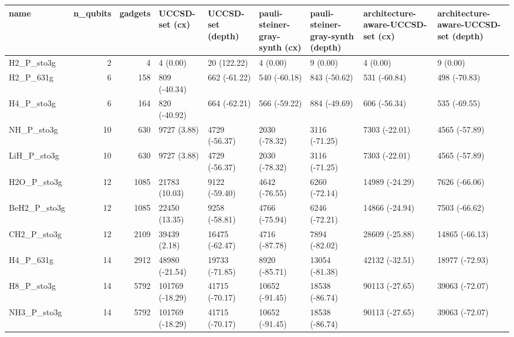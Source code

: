 \begin{tabular}{lrrllllll}
\toprule
name & n\_qubits & gadgets & UCCSD-set (cx) & UCCSD-set (depth) & pauli-steiner-gray-synth (cx) & pauli-steiner-gray-synth (depth) & architecture-aware-UCCSD-set (cx) & architecture-aware-UCCSD-set (depth) \\
\midrule
H2\_P\_sto3g & 2 & 4 & 4 (0.00) & 20 (122.22) & 4 (0.00) & 9 (0.00) & 4 (0.00) & 9 (0.00) \\
H2\_P\_631g & 6 & 158 & 809 (-40.34) & 662 (-61.22) & 540 (-60.18) & 843 (-50.62) & 531 (-60.84) & 498 (-70.83) \\
H4\_P\_sto3g & 6 & 164 & 820 (-40.92) & 664 (-62.21) & 566 (-59.22) & 884 (-49.69) & 606 (-56.34) & 535 (-69.55) \\
NH\_P\_sto3g & 10 & 630 & 9727 (3.88) & 4729 (-56.37) & 2030 (-78.32) & 3116 (-71.25) & 7303 (-22.01) & 4565 (-57.89) \\
LiH\_P\_sto3g & 10 & 630 & 9727 (3.88) & 4729 (-56.37) & 2030 (-78.32) & 3116 (-71.25) & 7303 (-22.01) & 4565 (-57.89) \\
H2O\_P\_sto3g & 12 & 1085 & 21783 (10.03) & 9122 (-59.40) & 4642 (-76.55) & 6260 (-72.14) & 14989 (-24.29) & 7626 (-66.06) \\
BeH2\_P\_sto3g & 12 & 1085 & 22450 (13.35) & 9258 (-58.81) & 4766 (-75.94) & 6246 (-72.21) & 14866 (-24.94) & 7503 (-66.62) \\
CH2\_P\_sto3g & 12 & 2109 & 39439 (2.18) & 16475 (-62.47) & 4716 (-87.78) & 7894 (-82.02) & 28609 (-25.88) & 14865 (-66.13) \\
H4\_P\_631g & 14 & 2912 & 48980 (-21.54) & 19733 (-71.85) & 8920 (-85.71) & 13054 (-81.38) & 42132 (-32.51) & 18977 (-72.93) \\
H8\_P\_sto3g & 14 & 5792 & 101769 (-18.29) & 41715 (-70.17) & 10652 (-91.45) & 18538 (-86.74) & 90113 (-27.65) & 39063 (-72.07) \\
NH3\_P\_sto3g & 14 & 5792 & 101769 (-18.29) & 41715 (-70.17) & 10652 (-91.45) & 18538 (-86.74) & 90113 (-27.65) & 39063 (-72.07) \\
\bottomrule
\end{tabular}
